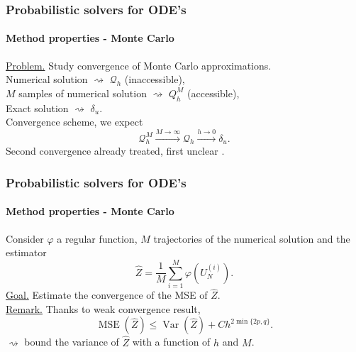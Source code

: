 \documentclass{beamer}
\newcommand{\MSE}{\operatorname{MSE}}
\newcommand{\Var}{\operatorname{Var}}
\renewcommand{\phi}{\varphi}
\begin{document}
\begin{frame}
	\frametitle{Probabilistic solvers for ODE's}
	\framesubtitle{Method properties - Monte Carlo}
	
	\underline{Problem.} Study convergence of Monte Carlo approximations. \\[0.5cm]
	Numerical solution $\rightsquigarrow$ $\mathcal Q_h$ (inaccessible), \\
	$M$ samples of numerical solution  $\rightsquigarrow$ $Q_h^M$ (accessible), \\
	Exact solution $\rightsquigarrow$ $\delta_u$. \\[0.5cm]
	
	Convergence scheme, we expect
	\begin{equation*}
	\mathcal Q_h^M \xrightarrow{M\to \infty} \mathcal Q_h \xrightarrow{h\to 0} \delta_u.
	\end{equation*}
	Second convergence already treated, first unclear \cite{KeH16}.
\end{frame}

\begin{frame}
	\frametitle{Probabilistic solvers for ODE's}
	\framesubtitle{Method properties - Monte Carlo}
	
	Consider $\phi$ a regular function, $M$ trajectories of the numerical solution and the estimator
	\begin{equation*}
		\hat Z = \frac{1}{M} \sum_{i = 1}^M \phi\left(U_N^{(i)}\right).
	\end{equation*}
	\underline{Goal.} Estimate the convergence of the MSE of $\hat Z$. \\[0.5cm]
	\underline{Remark.} Thanks to weak convergence result,
	\begin{equation*}
		\MSE(\hat Z) \leq \Var(\hat Z) + C h^{2\min\{2p, q\}}.
	\end{equation*}
	$\rightsquigarrow$ bound the variance of $\hat Z$ with a function of $h$ and $M$.
\end{frame}
\end{document}
